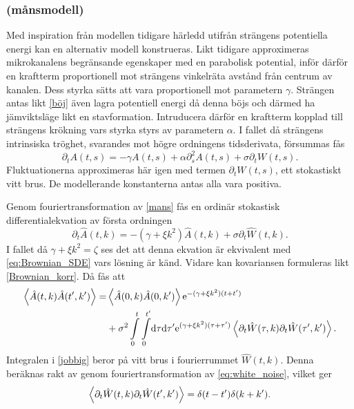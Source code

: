 \subsubsection{(månsmodell)}

Med inspiration från modellen tidigare härledd utifrån strängens potentiella energi kan en alternativ modell konstrueras. Likt tidigare approximeras mikrokanalens begränsande egenskaper med en parabolisk potential, inför därför en kraftterm proportionell mot strängens vinkelräta avstånd från centrum av kanalen. Dess styrka sätts att vara proportionell mot parametern $\gamma$. Strängen antas likt \eqref{böj} även lagra potentiell energi då denna böjs och därmed ha jämviktsläge likt en stavformation. Intruducera därför en kraftterm kopplad till strängens krökning vars styrka styrs av parametern $\alpha$. I fallet då strängens intrinsiska tröghet, svarandes mot högre ordningens tidsderivata, försummas fås
\begin{equation}
\label{mans}
    \partial_{t}A(t,s)=-\gamma A(t,s)+\alpha \partial_{s}^{2}A(t,s)+\sigma \partial_{t}W(t,s).
\end{equation}
Fluktuationerna approximeras här igen med termen $\partial_{t}W(t,s)$, ett stokastiskt vitt brus. De modellerande konstanterna antas alla vara positiva.


Genom fouriertransformation av \eqref{mans} fås en ordinär stokastisk differentialekvation av första ordningen
\begin{equation}
        \partial_{t}\hat{A}(t,k)=-\left(\gamma+\xi k^2\right)\hat{A}(t,k)+\sigma \partial_{t}\hat{W}(t,k).
\end{equation}
I fallet då $\gamma+\xi k^2=\zeta$ ses det att denna ekvation är ekvivalent med \eqref{eq:Brownian_SDE} vars lösning är känd. Vidare kan kovariansen formuleras likt \eqref{Brownian_korr}. Då fås att
\begin{equation}\label{jobbig}
\begin{aligned}
    \ev{\hat{A}(t,k)\hat{A}(t',k')} =& \ev{\hat{A}(0,k)\hat{A}(0,k')} \ee^{-(\gamma+\xi k^2)(t+t')}\\ 
    &+ \sigma^2 \int_{0}^{t}\int_{0}^{t'}\!\dd\tau\dd\tau' \ee^{(\gamma+\xi k^2)(\tau+\tau')} \ev{\partial_{t}\hat{W}(\tau,k)\partial_{t}\hat{W}(\tau',k')}.
\end{aligned}
\end{equation}
Integralen i \eqref{jobbig} beror på vitt brus i fourierrummet $\hat{W}(t,k)$. Denna beräknas rakt av genom fouriertransformation av \eqref{eq:white_noise}, vilket ger
\begin{equation}
    \ev{\partial_{t}\hat{W}(t,k)\partial_{t}\hat{W}(t',k')}=\delta(t-t')\delta(k+k').
\end{equation}

